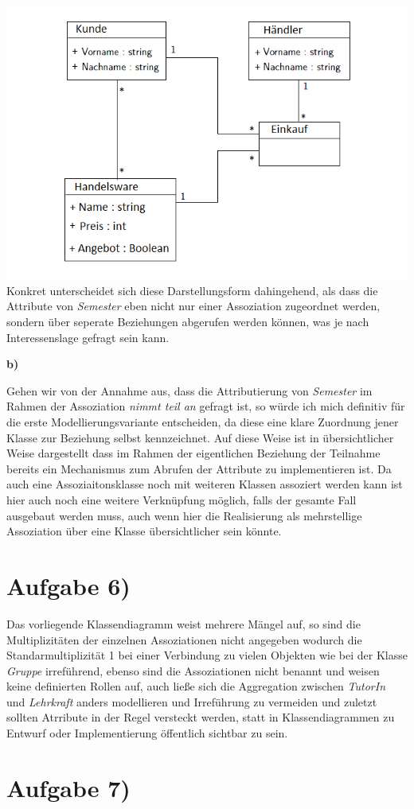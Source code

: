 \documentclass{swp1}
\begin{document}
\newline
\includegraphics[scale=0.5]{Mehrteilige_Assoziation}
\newline
Konkret unterscheidet sich diese Darstellungsform dahingehend, als dass die Attribute von \emph{Semester} eben nicht nur einer Assoziation zugeordnet werden, sondern über seperate Beziehungen abgerufen werden können, was je nach Interessenslage gefragt sein kann.\newline

\textbf{b)}\newline

Gehen wir von der Annahme aus, dass die Attributierung von \emph{Semester} im Rahmen der Assoziation \emph{nimmt teil an} gefragt ist, so würde ich mich definitiv für die erste Modellierungsvariante entscheiden, da diese eine klare Zuordnung jener Klasse zur Beziehung selbst kennzeichnet. Auf diese Weise ist in übersichtlicher Weise dargestellt dass im Rahmen der eigentlichen Beziehung der Teilnahme bereits ein Mechanismus zum Abrufen der Attribute zu implementieren ist.\newline
Da auch eine Assoziaitonsklasse noch mit weiteren Klassen assoziert werden kann ist hier auch noch eine weitere Verknüpfung möglich, falls der gesamte Fall ausgebaut werden muss, auch wenn hier die Realisierung als mehrstellige Assoziation über eine Klasse übersichtlicher sein könnte.

\section*{Aufgabe 6)}

Das vorliegende Klassendiagramm weist mehrere Mängel auf, so sind die Multiplizitäten der einzelnen Assoziationen nicht angegeben wodurch die Standarmultiplizität 1 bei einer Verbindung zu vielen Objekten wie bei der Klasse \emph{Gruppe} irreführend, ebenso sind die Assoziationen nicht benannt und weisen keine definierten Rollen auf, auch ließe sich die Aggregation zwischen \emph{TutorIn} und \emph{Lehrkraft} anders modellieren und Irreführung zu vermeiden und zuletzt sollten Atrribute in der Regel versteckt werden, statt in Klassendiagrammen zu Entwurf oder Implementierung öffentlich sichtbar zu sein.

\section*{Aufgabe 7)}
\end{document}

